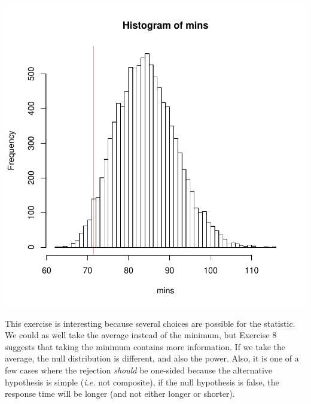 \documentclass[12pt]{article}
\begin{document}
\begin{Answer}[ref={exo9}]
  \centerline{\includegraphics[scale=0.5]{mins.pdf}}

  This exercise is interesting because several choices are
  possible for the statistic. We could as well take the average
  instead of the minimum, but Exercise 8 suggests that taking
  the minimum contains more information. If we take the average,
  the null distribution is different, and also the power. Also,
  it is one of a few cases where the rejection \textit{should}
  be one-sided because the alternative hypothesis is simple
  (\textit{i.e.} not composite), if the null hypothesis is
  false, the response time will be longer (and not either
  longer or shorter).

\end{Answer}
\end{document}
